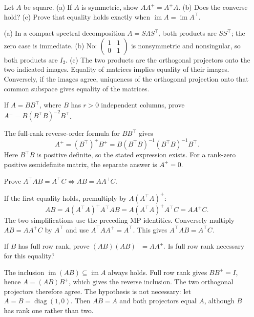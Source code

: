 \begin{problem}\label{ex:10:equal-projectors}
Let \(A\) be square. (a) If \(A\) is symmetric, show \(AA^+=A^+A\).
(b) Does the converse hold? (c) Prove that equality holds exactly when
\(\operatorname{im}A=\operatorname{im}A^\top\).
\end{problem}
\begin{solution}
(a) In a compact spectral decomposition \(A=S\Lambda S^\top\), both
products are \(SS^\top\); the zero case is immediate.
(b) No: \(\begin{pmatrix}1&1\\0&1\end{pmatrix}\) is nonsymmetric
and nonsingular, so both products are \(I_2\).
(c) The two products are the orthogonal projectors onto the two indicated
images. Equality of matrices implies equality of their images.
Conversely, if the images agree, uniqueness of the orthogonal projection
onto that common subspace gives equality of the matrices.
\end{solution}

\begin{problem}\label{ex:10:psd-factor}
If \(A=BB^\top\), where \(B\) has \(r>0\) independent columns, prove
\(A^+=B(B^\top B)^{-2}B^\top\).
\end{problem}
\begin{solution}
The full-rank reverse-order formula for \(BB^\top\) gives
\[
A^+=(B^\top)^+B^+
=B(B^\top B)^{-1}(B^\top B)^{-1}B^\top.
\]
Here \(B^\top B\) is positive definite, so the stated expression exists.
For a rank-zero positive semidefinite matrix, the separate answer is \(A^+=0\).
\end{solution}

\begin{problem}\label{ex:10:normal-equivalence}
Prove \(A^\top AB=A^\top C\iff AB=AA^+C\).
\end{problem}
\begin{solution}
If the first equality holds, premultiply by \(A(A^\top A)^+\):
\[
AB=A(A^\top A)^+A^\top AB=A(A^\top A)^+A^\top C=AA^+C.
\]
The two simplifications use the preceding MP identities.
Conversely multiply \(AB=AA^+C\) by \(A^\top\) and use
\(A^\top AA^+=A^\top\). This gives \(A^\top AB=A^\top C\).
\end{solution}

\begin{problem}\label{ex:10:range-product}
If \(B\) has full row rank, prove \((AB)(AB)^+=AA^+\).
Is full row rank necessary for this equality?
\end{problem}
\begin{solution}
The inclusion \(\operatorname{im}(AB)\subseteq\operatorname{im}A\)
always holds. Full row rank gives \(BB^+=I\), hence \(A=(AB)B^+\),
which gives the reverse inclusion. The two orthogonal projectors
therefore agree. The hypothesis is not necessary: let
\(A=B=\operatorname{diag}(1,0)\). Then \(AB=A\) and both projectors
equal \(A\), although \(B\) has rank one rather than two.
\end{solution}

